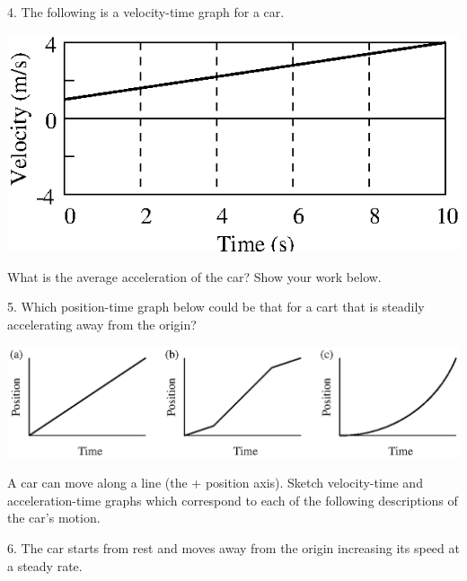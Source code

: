 4. The following is a velocity-time graph for a car.

\vspace{0.3cm}
{\par\centering \includegraphics{changing_fig10.eps} \par}
\vspace{0.3cm}

What is the average acceleration of the car? Show your work below.
\vspace{30mm}

5. Which position-time graph below could be that for a cart that is steadily
accelerating away from the origin?

\vspace{0.3cm}
{\par\centering \includegraphics{changing_fig11.eps} \par}
\vspace{0.3cm}

A car can move along a line (the + position axis). Sketch velocity-time and
acceleration-time graphs which correspond to each of the following descriptions
of the car's motion.

6. The car starts from rest and moves away from the origin increasing its speed
at a steady rate.

